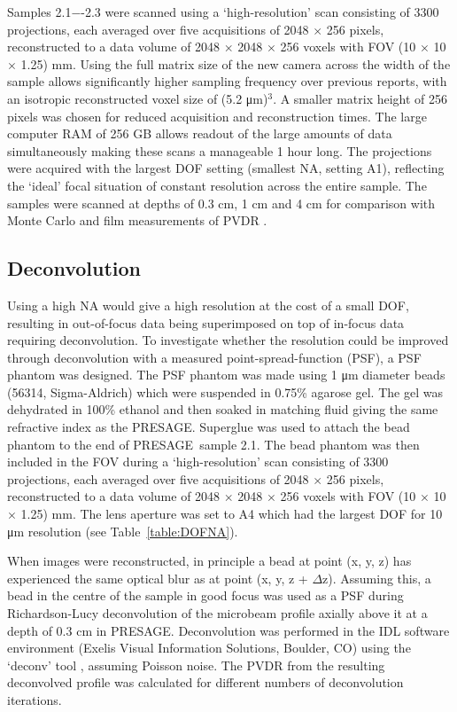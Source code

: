 	Samples 2.1−-2.3 were scanned using a `high-resolution' scan consisting of 3300 projections, each averaged over five acquisitions of 2048 $\times$ 256 pixels, reconstructed to a data volume of 2048 $\times$ 2048 $\times$ 256 voxels with FOV (10 $\times$ 10 $\times$ 1.25) mm. Using the full matrix size of the new camera across the width of the sample allows significantly higher sampling frequency over previous reports, with an isotropic reconstructed voxel size of (5.2 \si{\um})$^3$. A smaller matrix height of 256 pixels was chosen for reduced acquisition and reconstruction times. The large computer RAM of 256 GB allows readout of the large amounts of data simultaneously making these scans a manageable 1 hour long. The projections were acquired with the largest DOF setting (smallest NA, setting A1), reflecting the `ideal' focal situation of constant resolution across the entire sample. The samples were scanned at depths of 0.3 cm, 1 cm and 4 cm for comparison with Monte Carlo and film measurements of PVDR \cite{martinez-roviradevelopment2012}. 
	
	
	

	
	\subsection{Deconvolution}
	Using a high NA would give a high resolution at the cost of a small DOF, resulting in out-of-focus data being superimposed on top of in-focus data requiring deconvolution. To investigate whether the resolution could be improved through deconvolution with a measured point-spread-function (PSF), a PSF phantom was designed. The PSF phantom was made using 1 \si{\um} diameter beads (56314, Sigma-Aldrich) which were suspended in 0.75\% agarose gel. The gel was dehydrated in 100\% ethanol and then soaked in matching fluid %
	giving the same refractive index as the PRESAGE\textregistered. Superglue was used to attach the bead phantom to the end of PRESAGE\textregistered \ sample 2.1. The bead phantom was then included in the FOV during a `high-resolution' scan consisting of 3300 projections, each averaged over five acquisitions of 2048 $\times$ 256 pixels, reconstructed to a data volume of 2048 $\times$ 2048 $\times$ 256 voxels with FOV (10 $\times$ 10 $\times$ 1.25) mm. The lens aperture was set to A4  which had the largest DOF for 10 \si{\um} resolution (see Table~\ref{table:DOFNA}). 
	
	When images were reconstructed, in principle a bead at point (x, y, z) has experienced the same optical blur as at point (x, y, z + $\Delta $z). Assuming this, a bead in the centre of the sample in good focus was used as a PSF during Richardson-Lucy deconvolution of the microbeam profile axially above it at a depth of 0.3 cm in PRESAGE\textregistered. Deconvolution was performed in the IDL software environment (Exelis Visual Information Solutions, Boulder, CO) using the `deconv' tool \cite{varosi1993idl}, assuming Poisson noise. The PVDR from the resulting deconvolved profile was calculated for different numbers of deconvolution iterations.
	

